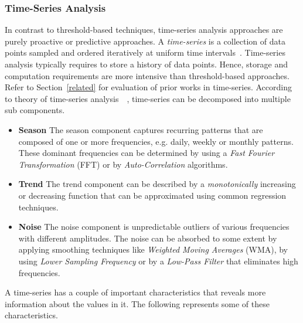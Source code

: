 \subsubsection{Time-Series Analysis} In contrast to threshold-based techniques, time-series analysis approaches are purely proactive or predictive approaches. A \emph{time-series} is a collection of data points sampled and ordered iteratively at uniform time  intervals~\cite{Lorido-Botran2014}. Time-series analysis typically requires to store a history of data points. Hence, storage and computation requirements are more intensive than threshold-based approaches. Refer to Section~\ref{related} for evaluation of prior works in time-series. According to theory of time-series analysis~\cite{TSA}~\cite{Herbst:2013}, time-series can be decomposed into multiple sub components.
\begin{itemize}
    \item \textbf{Season} The season component captures recurring patterns that are composed of one or more frequencies, e.g. daily, weekly or monthly patterns. These dominant frequencies can be determined by using a \emph{Fast Fourier Transformation} (FFT) or by \emph{Auto-Correlation} algorithms.
    \item \textbf{Trend} The trend component can be described by a \emph{monotonically} increasing or decreasing function that can be approximated using common regression techniques.
    \item \textbf{Noise} The noise component is unpredictable outliers of various frequencies with different amplitudes. The noise can be absorbed to some extent by applying smoothing techniques like \emph{Weighted Moving Averages} (WMA), by using \emph{Lower Sampling Frequency} or by a \emph{Low-Pass Filter} that eliminates high frequencies.
\end{itemize}
A time-series has a couple of important characteristics that reveals more information about the values in it. The following represents some of these characteristics.
